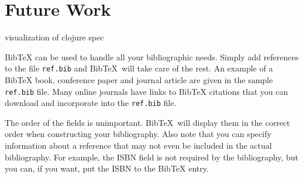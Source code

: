 \chapter{Future Work}
\label{chap:future}

visualization of clojure spec

\newcommand{\BibTeX}{Bib\TeX}

\BibTeX{} can be used to handle all your bibliographic needs.  Simply add
references to the file \texttt{ref.bib} and \BibTeX\ will take care of
the rest.  An example of a \BibTeX{} book, conference paper and journal
article are given in the sample \texttt{ref.bib} file.  Many online
journals have links to \BibTeX{} citations that you can download and
incorporate into the \texttt{ref.bib} file.

The order of the fields is unimportant. \BibTeX\ will display them
in the correct order when constructing your bibliography.  Also note
that you can specify information about a reference that may not even be
included in the actual bibliography.  For example, the ISBN field is not
required by the bibliography, but you can, if you want, put the ISBN to
the \BibTeX{} entry.

